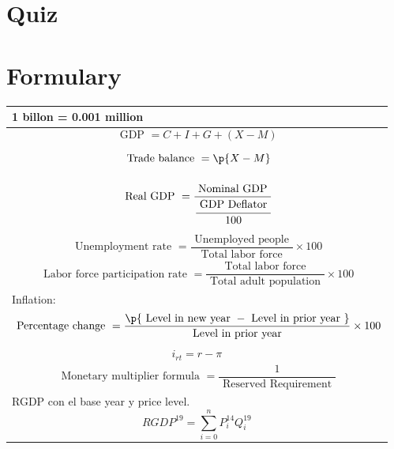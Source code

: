 \documentclass[openany]{book}
\begin{document}
\chapter{Quiz}




\chapter{Formulary}
\begin{center}
    \begin{supertabular}{ |p{16cm}| }
         billon = 0.001 million \\ 
        \hline
            \[
                \text{ GDP } = C + I + G + (X-M)
            \] \\
        \hline
            \[
                \text{ Trade balance } = \p{X - M} 
            \] \\
        \hline
            \[
                \text{ Real GDP } = \frac{\text{ Nominal GDP }}{\cfrac{\text{ GDP Deflator }}{100}} 
            \] \\
        \hline
            \[
                \text{ Unemployment rate } = \frac{\text{ Unemployed people }}{\text{ Total labor force }} \times 100 
            \] \\
        \hline
            \[
                \text{ Labor force participation rate } = \frac{\text{ Total labor force }}{\text{ Total adult population }} \times 100
            \] \\
        \hline
        Inflation: 
            \[
                \text{ Percentage change } = \frac{\p{\text{ Level in new year } - \text{ Level in prior year }} }{\text{ Level in prior year }} \times 100
            \] \\
        \hline
            \[ 
                i_{rt} = r - \pi  
            \] \\ 
        \hline
        \[
            \text{ Monetary multiplier formula } = \frac{1}{\text{ Reserved Requirement }} 
        \] \\
        \hline
        RGDP con el base year y price level. 
        \[
          RGDP^{19} = \sum_{i=0}^{n}P_{i}^{14} Q_{i}^{19}
\]
\end{supertabular}
\end{center}
\end{document}

